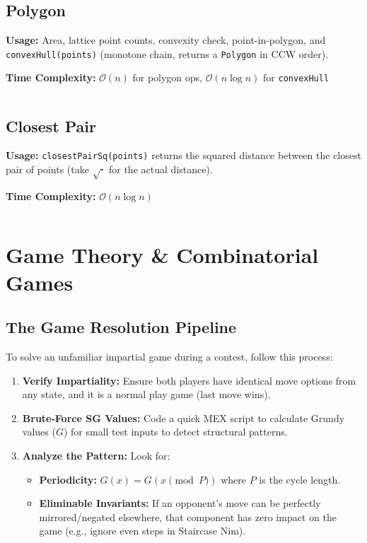   \subsection{Polygon}
    \par \textbf{Usage:} Area, lattice point counts, convexity check, point-in-polygon, and \texttt{convexHull(points)} (monotone chain, returns a \texttt{Polygon} in CCW order).
    \par \textbf{Time Complexity:} $\mathcal{O}(n)$ for polygon ops, $\mathcal{O}(n \log n)$ for \texttt{convexHull}
    \inputminted{cpp}{library/geo/polygon.hpp}
  \subsection{Closest Pair}
    \par \textbf{Usage:} \texttt{closestPairSq(points)} returns the squared distance between the closest pair of points (take $\sqrt{\cdot}$ for the actual distance).
    \par \textbf{Time Complexity:} $\mathcal{O}(n \log n)$
    \inputminted{cpp}{library/geo/closest_pair.hpp}

\section{Game Theory \& Combinatorial Games}

\subsection{The Game Resolution Pipeline}
\par To solve an unfamiliar impartial game during a contest, follow this process:
\begin{enumerate}
    \item \textbf{Verify Impartiality:} Ensure both players have identical move options from any state, and it is a normal play game (last move wins).
    \item \textbf{Brute-Force SG Values:} Code a quick MEX script to calculate Grundy values ($G$) for small test inputs to detect structural patterns.
    \item \textbf{Analyze the Pattern:} Look for:
    \begin{itemize}
        \item \textbf{Periodicity:} $G(x) = G(x \pmod P)$ where $P$ is the cycle length.
        \item \textbf{Eliminable Invariants:} If an opponent's move can be perfectly mirrored/negated elsewhere, that component has zero impact on the game (e.g., ignore even steps in Staircase Nim).
    \end{itemize}
\end{enumerate}

